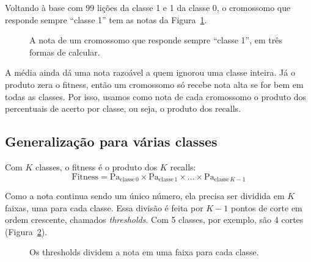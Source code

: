 \documentclass[11pt,a4paper]{article}
\newcommand{\Pa}[1]{\mathrm{Pa}_{\mathrm{classe}\,#1}}
\begin{document}
Voltando à base com 99 lições da classe 1 e 1 da classe 0, o cromossomo que responde sempre ``classe 1'' tem as notas da Figura~\ref{fig:produto}.

\begin{figure}[H]
\centering
{}
\caption{A nota de um cromossomo que responde sempre ``classe 1'', em três formas de calcular.}
\label{fig:produto}
\end{figure}

A média ainda dá uma nota razoável a quem ignorou uma classe inteira. Já o produto zera o fitness, então um cromossomo só recebe nota alta se for bem em todas as classes. Por isso, usamos como nota de cada cromossomo o produto dos percentuais de acerto por classe, ou seja, o produto dos recalls.

\subsection{Generalização para várias classes}

Com $K$ classes, o fitness é o produto dos $K$ recalls:
\[
  \text{Fitness} = \Pa{0} \times \Pa{1} \times \dots \times \Pa{K-1}
\]

Como a nota continua sendo um único número, ela precisa ser dividida em $K$ faixas, uma para cada classe. Essa divisão é feita por $K-1$ pontos de corte em ordem crescente, chamados \emph{thresholds}. Com 5 classes, por exemplo, são 4 cortes (Figura~\ref{fig:thresholds}).

\begin{figure}[H]
\centering
{}
\caption{Os thresholds dividem a nota em uma faixa para cada classe.}
\label{fig:thresholds}
\end{figure}
\end{document}
